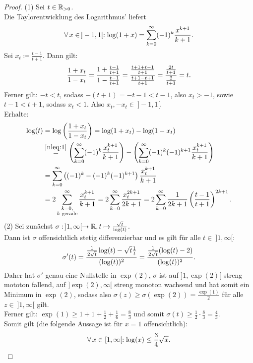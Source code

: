 \begin{proof}
(1) Sei $t \in \mathbb{R}_{>0}$.\\
Die Taylorentwicklung des Logarithmus' liefert
\begin{align}\forall\, x \in\!\ ]-1, 1[: \log(1+x) = \sum_{k=0}^\infty (-1)^k 
\frac {x^{k+1}}{k+1}\text. \label{nleq:1}\end{align}
Sei $x_t \coloneqq  \frac{t-1}{t+1}$. Dann gilt:
\[ \frac{1+x_t}{1-x_t} = \frac{1+\frac{t-1}{t+1}}{1-\frac{t-1}{t+1}}
= \frac{\frac{t+1+t-1} {t+1}}{\frac{t+1-t+1}{t+1}}
= \frac{\frac{2t}{t+1}}{\frac 2 {t+1}}=t \text.\]
Ferner gilt: $-t < t$, sodass $-(t+1)=-t -1< t-1$, also $x_t > -1$,
sowie $t-1 < t+1$, sodass $x_t < 1$. Also $x_t, -x_t \in\!\  ]-1,1[$.\\
Erhalte:
\begin{align*}
\log(t) &= \log\left(\frac{1+x_t}{1-x_t} \right) = \log(1+x_t)-\log(1-x_t)\\
&\overset{\eqref{nleq:1}}=
\left(\sum_{k=0}^\infty (-1)^k\frac{x_t^{k+1}}{k+1} \right)
-\left(\sum_{k=0}^\infty (-1)^k(-1)^{k+1}\frac{x_t^{k+1}}{k+1} \right)\\
&=\sum_{k=0}^\infty\left((-1)^k-(-1)^k(-1)^{k+1} \right)\frac{x_t^{k+1}}{k+1}\\
&=2\sum_{\substack{k=0,\\ k \text{ gerade}}}^\infty\frac{x_t^{k+1}}{k+1}
= 2\sum_{k=0}^\infty\frac{x_t^{2k+1}}{2k+1} 
= 2\sum_{k=0}^\infty\frac{1}{2k+1}\left(\frac{t-1}{t+1}\right)^{2k+1}\text.
\end{align*}
(2) Sei zunächst 
$\sigma:\!\  ]1, \infty[ \rightarrow \mathbb{R}, t \mapsto \frac{\sqrt t}{\log(t)}$.\\
Dann ist $\sigma$ offensichtlich stetig differenzierbar und es gilt für alle
$t \in\!\  ]1, \infty[$:
\[\sigma'(t)=\frac {\frac 1{2\sqrt t}\log(t)-\sqrt t\frac 1 t}{(\log(t))^2}
= \frac{\frac 1 {2\sqrt t}(\log(t) - 2)}{(\log(t))^2}\text.\]
Daher hat $\sigma'$ genau eine Nullstelle in $\exp(2)$, $\sigma$ ist auf 
$]1, \exp(2)[$ streng mototon
fallend, auf $]\exp(2), \infty[$ streng monoton wachsend und hat somit ein
Minimum in $\exp(2)$, sodass also
$\sigma(z)\ge\sigma(\exp(2))=\frac{\exp(1)}2$ für alle $z\in\!\  ]1,\infty[$
gilt.\\
Ferner gilt: $\exp(1)\ge 1 + 1 + \frac 1 2 + \frac 1 6 = \frac 8 3$ und somit
$\sigma(t) \ge \frac 1 2 \cdot\frac 8 3 = \frac 4 3$.\\
Somit gilt (die folgende Aussage ist für $x=1$ offensichtlich):
\begin{align}
\forall\,x\in [1,\infty[: \log(x) \le \frac 3 4 \sqrt x \text.

\end{align}
\end{proof}
